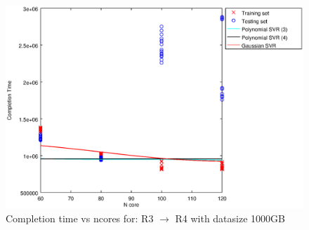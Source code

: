 
\begin {figure}[hbtp]
\centering
\includegraphics[width=\textwidth]{output/R3_R4_1000_ALL_FEATURES/plot_R3_R4_1000_bestmodels.eps}
\caption{Completion time vs ncores for: R3 $\rightarrow$ R4 with datasize 1000GB}
\label{fig:coreonly_linear_R3_R4_1000}
\end {figure}
